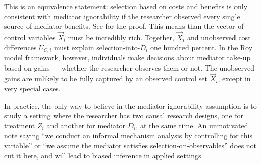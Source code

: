 This is an equivalence statement: selection based on costs and benefits is only consistent with mediator ignorability if the researcher observed every single source of mediator benefits.
See  for the proof.
This means than the vector of control variables $\vec X_i$ must be incredibly rich.
Together, $\vec X_i$ and unobserved cost differences $U_{C,i}$ must explain selection-into-$D_i$ one hundred percent.
In the Roy model framework, however, individuals make decisions about mediator take-up based on gains --- whether the researcher observes them or not.
The unobserved gains are unlikely to be fully captured by an observed control set $\vec X_i$, except in very special cases.

In practice, the only way to believe in the mediator ignorability assumption is to study a setting where the researcher has two causal research designs, one for treatment $Z_i$ and another for mediator $D_i$, at the same time.
An unmotivated note saying 
``we conduct an informal mechanism analysis by controlling for this variable''
or
``we assume the mediator satisfies selection-on-observables''
does not cut it here, and will lead to biased inference in applied settings.

% 
% 
% 
